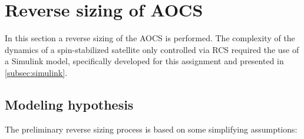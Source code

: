 \section{Reverse sizing of AOCS}
\label{sec:AOCS_sizing}

In this section a reverse sizing of the AOCS is performed. The complexity of the dynamics of a spin-stabilized satellite only controlled via RCS required the use of a Simulink model, specifically developed for this assignment and presented in \autoref{subsec:simulink}.
\subsection{Modeling hypothesis}
\label{subsec:mod_hypo}
The preliminary reverse sizing process is based on some simplifying assumptions:

